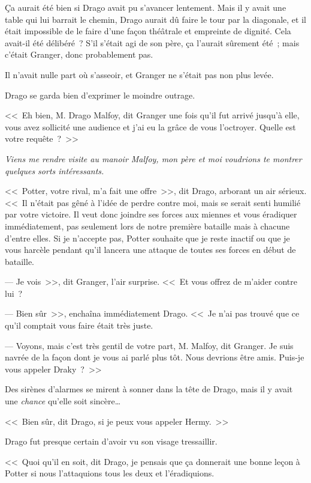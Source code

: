 Ça aurait été bien si Drago avait pu s'avancer lentement. Mais il y avait une table qui lui barrait le chemin, Drago aurait dû faire le tour par la diagonale, et il était impossible de le faire d'une façon théâtrale et empreinte de dignité. Cela avait-il été délibéré~? S'il s'était agi de son père, ça l'aurait sûrement été~; mais c'était Granger, donc probablement pas.

Il n'avait nulle part où s'asseoir, et Granger ne s'était pas non plus levée.

Drago se garda bien d'exprimer le moindre outrage.

<<~Eh bien, M. Drago Malfoy, dit Granger une fois qu'il fut arrivé jusqu'à elle, vous avez sollicité une audience et j'ai eu la grâce de vous l'octroyer. Quelle est votre requête~?~>>

\emph{Viens me rendre visite au manoir Malfoy, mon père et moi voudrions te montrer quelques sorts intéressants.}

<<~Potter, votre rival, m'a fait une offre~>>, dit Drago, arborant un air sérieux. <<~Il n'était pas gêné à l'idée de perdre contre moi, mais se serait senti humilié par votre victoire. Il veut donc joindre ses forces aux miennes et vous éradiquer immédiatement, pas seulement lors de notre première bataille mais à chacune d'entre elles. Si je n'accepte pas, Potter souhaite que je reste inactif ou que je vous harcèle pendant qu'il lancera une attaque de toutes ses forces en début de bataille.

--- Je vois~>>, dit Granger, l'air surprise. <<~Et vous offrez de m'aider contre lui~?

--- Bien sûr~>>, enchaîna immédiatement Drago. <<~Je n'ai pas trouvé que ce qu'il comptait vous faire était très juste.

--- Voyons, mais c'est très gentil de votre part, M. Malfoy, dit Granger. Je suis navrée de la façon dont je vous ai parlé plus tôt. Nous devrions être amis. Puis-je vous appeler Draky~?~>>

Des sirènes d'alarmes se mirent à sonner dans la tête de Drago, mais il y avait une \emph{chance} qu'elle soit sincère…

<<~Bien sûr, dit Drago, si je peux vous appeler Hermy.~>>

Drago fut presque certain d'avoir vu son visage tressaillir.

<<~Quoi qu'il en soit, dit Drago, je pensais que ça donnerait une bonne leçon à Potter si nous l'attaquions tous les deux et l'éradiquions.

